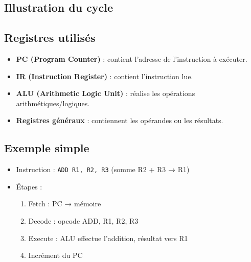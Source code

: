 \documentclass[12pt,a4paper]{article}
\begin{document}
\subsection{Illustration du cycle}
\begin{center}
\end{center}

\subsection{Registres utilisés}
\begin{itemize}
  \item \textbf{PC (Program Counter)} : contient l’adresse de l’instruction à exécuter.
  \item \textbf{IR (Instruction Register)} : contient l’instruction lue.
  \item \textbf{ALU (Arithmetic Logic Unit)} : réalise les opérations arithmétiques/logiques.
  \item \textbf{Registres généraux} : contiennent les opérandes ou les résultats.
\end{itemize}

\subsection{Exemple simple}
\begin{itemize}
  \item Instruction : \texttt{ADD R1, R2, R3} (somme R2 + R3 → R1)
  \item Étapes :
  \begin{enumerate}
    \item Fetch : PC → mémoire
    \item Decode : opcode ADD, R1, R2, R3
    \item Execute : ALU effectue l’addition, résultat vers R1
    \item Incrément du PC
  \end{enumerate}
\end{itemize}
\end{document}
